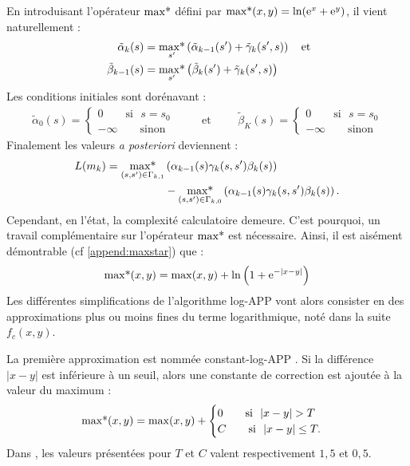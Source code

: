 En introduisant l'opérateur  $\operatorname*{max*}$ défini par $\operatorname*{max*}(x,y) = \ln(\mathrm{e}^x+ \mathrm{e}^y)$, il vient naturellement :
\begin{align*}
	~\tilde{\alpha}_k(s)    & = \operatorname*{max*}\limits_{s'}\left(\tilde{\alpha}_{k-1}(s') + \tilde{\gamma}_k(s', s)\right) 
	\quad\text{et} \\
	~\tilde{\beta}_{k-1}(s) & = \operatorname*{max*}\limits_{s'} \left(\tilde{\beta}_{k}(s') + \tilde{\gamma}_k(s', s)\right)   
\end{align*}
Les conditions initiales sont dorénavant : 
\[
	\begin{split}
		\tilde{\alpha}_0(s)=\begin{cases}
		0 \qquad\text{si~~} s = s_0 \\
		-\infty \qquad\text{sinon}
		\end{cases}
	\end{split}\qquad\text{et}\qquad
	\begin{split}
		\tilde{\beta}_K(s)=\begin{cases}
		0 \qquad\text{si~~} s = s_0 \\
		-\infty \qquad\text{sinon}
		\end{cases}
	\end{split}
\]
Finalement les valeurs \textit{a posteriori} deviennent : 
\begin{align}
	L(m_k) 	= \operatorname*{max*}\limits_{(s,s')\in\Gamma_{k,1}} & \left(\alpha_{k-1}(s) \gamma_k(s,s') \beta_k(s)\right) \notag \\\
	&- \operatorname*{max*}\limits_{(s,s')\in\Gamma_{k,0}}\left(\alpha_{k-1}(s) \gamma_k(s,s') \beta_k(s)\right).				
\end{align}
Cependant, en l'état, la complexité calculatoire demeure. C'est pourquoi, un travail complémentaire sur l'opérateur $\operatorname*{max*}$ 
est nécessaire. Ainsi, il est aisément démontrable (cf \ref{append:maxstar}) que : 
\[\operatorname*{max*}(x,y)=\max(x,y) +\ln\left(1+\mathrm{e}^{-|x-y|}\right) \]
Les différentes simplifications de l'algorithme log-APP vont alors consister en des approximations plus ou moins fines du 
terme logarithmique, noté dans la suite $f_c(x,y)$.

La première approximation est nommée constant-log-APP \cite{constantlog1}. Si la différence $|x-y|$ est inférieure à un 
seuil, alors une constante de correction est ajoutée à la valeur du maximum : 
\begin{equation}
	\operatorname*{max*}(x,y)=\max(x,y) + \begin{cases} 0 \qquad\text{si~~} |x-y| > T \\
	C \qquad\text{si~~} |x-y| \leq T. \end{cases}
\end{equation}
Dans \cite{constantlog2}, les valeurs présentées pour $T$ et $C$ valent respectivement $1,5$ et $0,5$.

